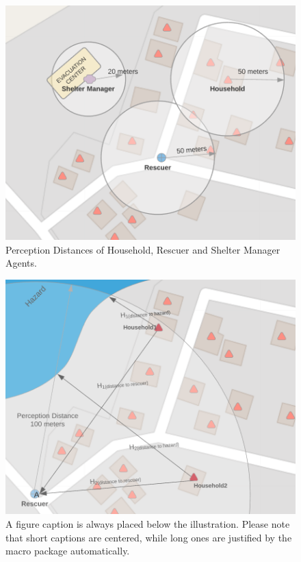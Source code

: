 \documentclass[runningheads]{llncs}
\begin{document}
\begin{figure}
\centering
\includegraphics[scale=0.6]{_perception_distances.png}
\caption{Perception Distances of Household, Rescuer and Shelter Manager Agents.} \label{_perception_distances}
\end{figure}

\begin{figure}
\centering
\includegraphics[scale=0.6]{_priority_distance.png}
\caption{A figure caption is always placed below the illustration. Please note that short captions are centered, while long ones are justified by the macro package automatically.} \label{_abms_distance_priority}
\end{figure}
\end{document}
